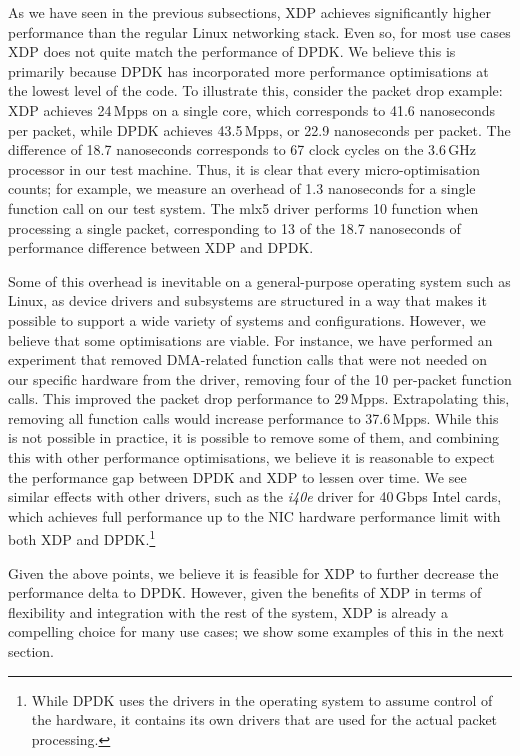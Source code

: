 \documentclass[sigconf]{acmart}
\begin{document}
As we have seen in the previous subsections, XDP achieves significantly higher
performance than the regular Linux networking stack. Even so, for most use cases
XDP does not quite match the performance of DPDK. We believe this is primarily
because DPDK has incorporated more performance optimisations at the lowest level
of the code. To illustrate this, consider the packet drop example: XDP achieves
24\,Mpps on a single core, which corresponds to 41.6 nanoseconds per packet,
while DPDK achieves 43.5\,Mpps, or 22.9 nanoseconds per packet. The difference
of 18.7 nanoseconds corresponds to 67 clock cycles on the 3.6\,GHz processor in
our test machine. Thus, it is clear that every micro-optimisation counts; for
example, we measure an overhead of 1.3 nanoseconds for a single function call on
our test system. The mlx5 driver performs 10 function when processing a single
packet, corresponding to 13 of the 18.7 nanoseconds of performance difference
between XDP and DPDK.

Some of this overhead is inevitable on a general-purpose operating system such
as Linux, as device drivers and subsystems are structured in a way that makes it
possible to support a wide variety of systems and configurations. However, we
believe that some optimisations are viable. For instance, we have performed an
experiment that removed DMA-related function calls that were not needed on our
specific hardware from the driver, removing four of the 10 per-packet function
calls. This improved the packet drop performance to 29\,Mpps. Extrapolating
this, removing all function calls would increase performance to 37.6\,Mpps.
While this is not possible in practice, it is possible to remove some of them,
and combining this with other performance optimisations, we believe it is
reasonable to expect the performance gap between DPDK and XDP to lessen over
time. We see similar effects with other drivers, such as the \emph{i40e} driver
for 40\,Gbps Intel cards, which achieves full performance up to the NIC hardware
performance limit with both XDP and DPDK.\footnote{While DPDK uses the drivers
  in the operating system to assume control of the hardware, it contains its own
  drivers that are used for the actual packet processing.}
%

Given the above points, we believe it is feasible for XDP to further decrease
the performance delta to DPDK. However, given the benefits of XDP in terms of
flexibility and integration with the rest of the system, XDP is already a
compelling choice for many use cases; we show some examples of this in the next
section.
\end{document}
